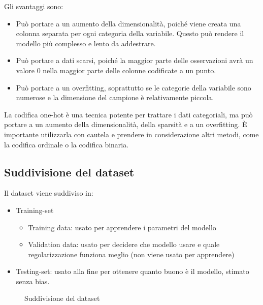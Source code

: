 \documentclass[
	a4paper,
	11pt,
	oneside
]{book}
\theoremstyle{std}
\begin{document}
	Gli svantaggi sono:
	\begin{itemize}
		\item Può portare a un aumento della dimensionalità, poiché viene creata una colonna separata per ogni categoria della variabile. Questo può rendere il modello più complesso e lento da addestrare.
		\item Può portare a dati scarsi, poiché la maggior parte delle osservazioni avrà un valore 0 nella maggior parte delle colonne codificate a un punto.
		\item Può portare a un overfitting, soprattutto se le categorie della variabile sono numerose e la dimensione del campione è relativamente piccola.
	\end{itemize}
	La codifica one-hot è una tecnica potente per trattare i dati categoriali, ma può portare a un aumento della dimensionalità, della sparsità e a un overfitting. È importante utilizzarla con cautela e prendere in considerazione altri metodi, come la codifica ordinale o la codifica binaria.
	
	\subsection{Suddivisione del dataset}
	Il dataset viene suddiviso in:
	\begin{itemize}
		\item Training-set
			\begin{itemize}
				\item Training data: usato per apprendere i parametri del modello
				\item Validation data: usato per decidere che modello usare e quale regolarizzazione funziona meglio (non viene usato per apprendere)
			\end{itemize}
		\item Testing-set: usato alla fine per ottenere quanto buono è il modello, stimato senza bias.
	\end{itemize}
	\begin{figure}[h]
		\centering
		\caption{Suddivisione del dataset}
	\end{figure}
	
\end{document}

